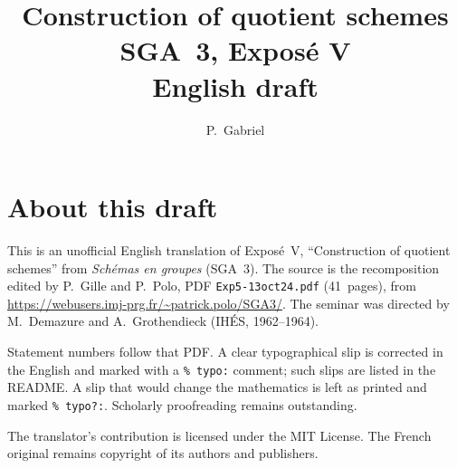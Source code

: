 \documentclass[11pt,a4paper,oneside]{amsbook}
\title[SGA~3, Expos\'e V (English draft)]{Construction of quotient schemes\\
{\normalsize SGA~3, Expos\'e V\\English draft}}
\author{P.\ Gabriel}
\date{}
\begin{document}
\frontmatter
\maketitle

\chapter*{About this draft}
This is an unofficial English translation of Expos\'e~V, ``Construction of quotient schemes''
from \textit{Sch\'emas en groupes} (SGA~3).
The source is the recomposition edited by P.~Gille and P.~Polo,
PDF \texttt{Exp5-13oct24.pdf} (41~pages),
from \url{https://webusers.imj-prg.fr/~patrick.polo/SGA3/}.
The seminar was directed by M.~Demazure and A.~Grothendieck
(IH\'ES, 1962--1964).

Statement numbers follow that PDF. A clear typographical slip is
corrected in the English and marked with a \texttt{\% typo:} comment;
such slips are listed in the README. A slip that would change the
mathematics is left as printed and marked \texttt{\% typo?:}.
Scholarly proofreading remains outstanding.

The translator's contribution is licensed under the MIT License.
The French original remains copyright of its authors and publishers.

\tableofcontents
\mainmatter







\end{document}

